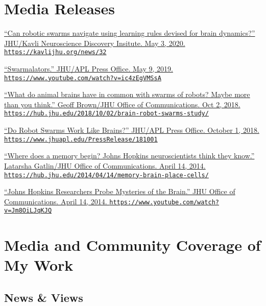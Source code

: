\documentclass[10pt]{article}
\newcommand{\itemtitle}[1]{{\color{hopkinsblue}\ul{#1}}}
\newcommand{\aurl}[1]{{\color{dimgray}\texttt{#1}}}
\begin{document}
\section*{Media Releases}

\begin{description}
  \item \href{https://kavlijhu.org/news/32} {``\itemtitle{Can
        robotic swarms navigate using learning rules devised for brain
      dynamics?}'' JHU/Kavli Neuroscience Discovery Insitute. May 3, 2020.
    \aurl{https://kavlijhu.org/news/32}}
  \item \href{https://www.youtube.com/watch?v=ic4zEgVMSsA}
    {``\itemtitle{Swarmalators}.'' JHU/APL Press Office. May 9, 2019.
    \aurl{https://www.youtube.com/watch?v=ic4zEgVMSsA}}
  \item \href{https://hub.jhu.edu/2018/10/02/brain-robot-swarms-study/}
    {``\itemtitle{What do animal brains have in common with swarms of robots?
      Maybe more than you think}.'' Geoff Brown/JHU Office of Communications. Oct 2,
    2018. \aurl{https://hub.jhu.edu/2018/10/02/brain-robot-swarms-study/}}
  \item \href{https://www.jhuapl.edu/PressRelease/181001}
    {``\itemtitle{Do Robot Swarms Work Like Brains?}'' JHU/APL Press Office. October 1, 2018.
    \aurl{https://www.jhuapl.edu/PressRelease/181001}}
  \item \href{https://hub.jhu.edu/2014/04/14/memory-brain-place-cells/}
    {``\itemtitle{Where does a memory begin? Johns Hopkins neuroscientists think they
      know}.'' Latarsha Gatlin/JHU Office of Communications. April 14, 2014.
    \aurl{https://hub.jhu.edu/2014/04/14/memory-brain-place-cells/}}
  \item \href{https://www.youtube.com/watch?v=Jm8OiLJqKJQ}
    {``\itemtitle{Johns Hopkins Researchers Probe Mysteries of
      the Brain}.'' JHU Office of Communications. April 14, 2014.
    \aurl{https://www.youtube.com/watch?v=Jm8OiLJqKJQ}}
\end{description}

\section*{Media and Community Coverage of My Work}

\subsection*{News \& Views}
\end{document}
